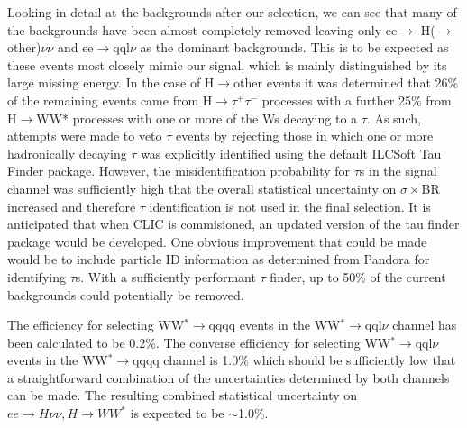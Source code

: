 Looking in detail at the backgrounds after our selection, we can see that many of the backgrounds have been almost completely removed leaving only ee$\rightarrow$ H($\rightarrow$ other)$\nu\nu$ and ee$\rightarrow$qql$\nu$ as the dominant backgrounds. This is to be expected as these events most closely mimic our signal, which is mainly distinguished by its large missing energy. In the case of H$\rightarrow$other events it was determined that 26\% of the remaining events came from H$\rightarrow\tau^+\tau^-$ processes with a further 25\% from H$\rightarrow$WW* processes with one or more of the Ws decaying to a $\tau$. As such, attempts were made to veto $\tau$ events by rejecting those in which one or more hadronically decaying $\tau$ was explicitly identified using the default ILCSoft Tau Finder \cite{TauFinder} package. However, the misidentification probability for $\tau$s in the signal channel was sufficiently high that the overall statistical uncertainty on $\sigma \times$BR increased and therefore $\tau$ identification is not used in the final selection. It is anticipated that when \ac{CLIC} is commisioned, an updated version of the tau finder package would be developed. One obvious improvement that could be made would be to include particle ID information as determined from Pandora for identifying $\tau$s. With a sufficiently performant $\tau$ finder, up to 50\% of the current backgrounds could potentially be removed. 

The efficiency for selecting WW$^*\rightarrow$qqqq events in the WW$^*\rightarrow$qql$\nu$ channel has been calculated to be 0.2\%. The converse efficiency for selecting WW$^*\rightarrow$qql$\nu$ events in the WW$^*\rightarrow$qqqq channel is 1.0\% which should be sufficiently low that a straightforward combination of the uncertainties determined by both channels can be made. The resulting combined statistical uncertainty on $ee\rightarrow H\nu\nu, H\rightarrow WW^*$ is expected to be $\sim$1.0\%.

